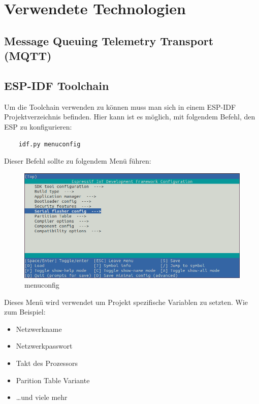 \chapter{Verwendete Technologien}\label{cha:used-technologies}

\section{Message Queuing Telemetry Transport (MQTT)}\label{sec:mqtt}


\section{ESP-IDF Toolchain}\label{sec:esp-idf-toolchain}
Um die Toolchain verwenden zu können muss man sich in einem ESP-IDF Projektverzeichnis befinden. Hier kann ist es möglich, mit folgendem Befehl, den ESP zu konfigurieren:

\begin{verbatim}
    idf.py menuconfig
\end{verbatim}

Dieser Befehl sollte zu folgendem Menü führen:
\begin{figure}[H]
    \begin{center}
        \includegraphics[scale=0.5]{images/menuconfig.png}
        \caption{menuconfig \cite{menuconfig_picture}}
    \end{center}
\end{figure}
\pagebreak
Dieses Menü wird verwendet um Projekt spezifische Variablen zu setzten. Wie zum Beispiel:
\begin{itemize}
    \item Netzwerkname
    \item Netzwerkpasswort
    \item Takt des Prozessors
    \item Parition Table Variante
    \item \dots und viele mehr
\end{itemize}


